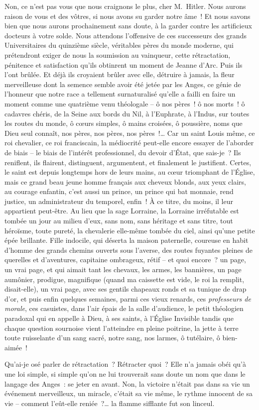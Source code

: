\documentclass[french,twoside]{book} %
\begin{document}
Non, ce n’est pas vous que nous craignons le plus, cher M. Hitler. Nous aurons raison de vous et des vôtres, si nous avons su garder notre âme ! Et nous savons bien que nous aurons prochainement sans doute, à la garder contre les artificieux docteurs à votre solde. Nous attendons l’offensive de ces successeurs des grands Universitaires du quinzième siècle, véritables pères du monde moderne, qui prétendront exiger de nous la soumission au vainqueur, cette rétractation, pénitence et satisfaction qu’ils obtinrent un moment de Jeanne d’Arc. Puis ils l’ont brûlée. Et déjà ils croyaient brûler avec elle, détruire à jamais, la fleur merveilleuse dont la semence semble avoir été jetée par les Anges, ce génie de l’honneur que notre race a tellement surnaturalisé qu’elle a failli en faire un moment comme une quatrième venu théologale – ô nos pères ! ô nos morts ! ô cadavres chéris, de la Seine aux bords du Nil, à l’Euphrate, à l’Indus, sur toutes les routes du monde, ô cœurs simples, ô mains croisées, ô poussière, noms que Dieu seul connaît, nos pères, nos pères, nos pères !… Car un saint Louis même, ce roi chevalier, ce roi franciscain, la médiocrité peut-elle encore essayer de l’aborder de biais – le biais de l’intérêt professionnel, du devoir d’État, que sais-je ? Ils reniflent, ils flairent, distinguent, argumentent, et finalement le justifient. Certes, le saint est depuis longtemps hors de leurs mains, au cœur triomphant de l’Église, mais ce grand beau jeune homme français aux cheveux blonds, aux yeux clairs, au courage enfantin, c’est aussi un prince, un prince qui bat monnaie, rend justice, un administrateur du temporel, enfin ! À ce titre, du moins, il leur appartient peut-être. Au lieu que la sage Lorraine, la Lorraine irréfutable est tombée un jour au milieu d’eux, sans nom, sans héritage et sans titre, tout héroïsme, toute pureté, la chevalerie elle-même tombée du ciel, ainsi qu’une petite épée brillante. Fille indocile, qui déserta la maison paternelle, coureuse en habit d’homme des grands chemins ouverts sous l’averse, des routes fuyantes pleines de querelles et d’aventures, capitaine ombrageux, rétif – et quoi encore ? un page, un vrai page, et qui aimait tant les chevaux, les armes, les bannières, un page aumônier, prodigue, magnifique (quand ma caissette est vide, le roi la remplit, disait-elle), un vrai page, avec ses gentils chapeaux ronds et sa tunique de drap d’or, et puis enfin quelques semaines, parmi ces vieux renards, ces \emph{professeurs de morale}, ces casuistes, dans l’air épais de la salle d’audience, le petit théologien paradoxal qui en appelle à Dieu, à ses saints, à l’Église Invisible tandis que chaque question sournoise vient l’atteindre en pleine poitrine, la jette à terre toute ruisselante d’un sang sacré, notre sang, nos larmes, ô tutélaire, ô bien-aimée !\par
Qu’ai-je osé parler de rétractation ? Rétracter quoi ? Elle n’a jamais obéi qu’à une loi simple, si simple qu’on ne lui trouverait sans doute un nom que dans le langage des Anges : se jeter en avant. Non, la victoire n’était pas dans sa vie un événement merveilleux, un miracle, c’était sa vie même, le rythme innocent de sa vie – comment l’eût-elle reniée ?… la flamme sifflante fut son linceul.\par
\end{document}
